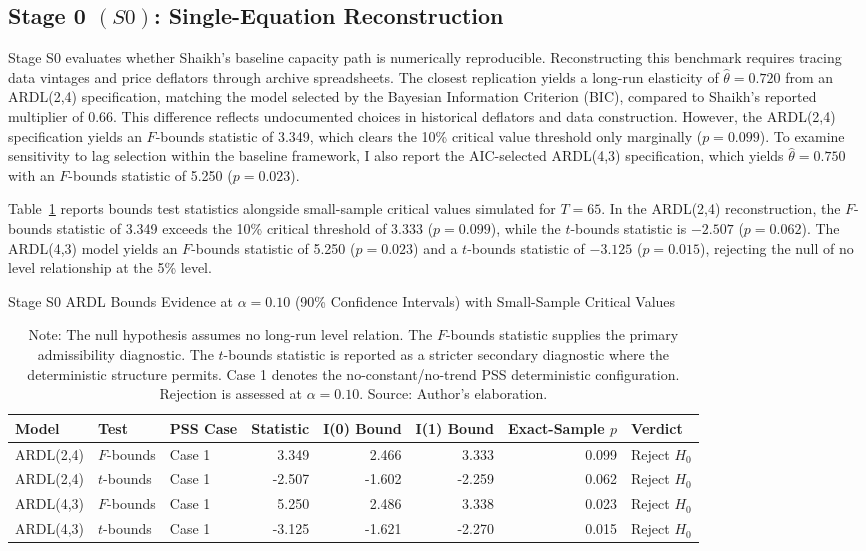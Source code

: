 \subsection{Stage 0 \texorpdfstring{$(S0)$}{}: Single-Equation Reconstruction}
\label{subsec:S0_reproducibility_new}

Stage S0 evaluates whether Shaikh's baseline capacity path is numerically reproducible. Reconstructing this benchmark requires tracing data vintages and price deflators through archive spreadsheets. The closest replication yields a long-run elasticity of $\hat{\theta}=0.720$ from an ARDL(2,4) specification, matching the model selected by the Bayesian Information Criterion (BIC), compared to Shaikh's reported multiplier of 0.66. This difference reflects undocumented choices in historical deflators and data construction. However, the ARDL(2,4) specification yields an $F$-bounds statistic of 3.349, which clears the 10\% critical value threshold only marginally ($p=0.099$). To examine sensitivity to lag selection within the baseline framework, I also report the AIC-selected ARDL(4,3) specification, which yields $\hat{\theta}=0.750$ with an $F$-bounds statistic of 5.250 ($p=0.023$).

Table~\ref{tab:s0_bounds_alpha10} reports bounds test statistics alongside small-sample critical values simulated for $T=65$. In the ARDL(2,4) reconstruction, the $F$-bounds statistic of 3.349 exceeds the 10\% critical threshold of 3.333 ($p=0.099$), while the $t$-bounds statistic is $-2.507$ ($p=0.062$). The ARDL(4,3) model yields an $F$-bounds statistic of 5.250 ($p=0.023$) and a $t$-bounds statistic of $-3.125$ ($p=0.015$), rejecting the null of no level relationship at the 5\% level.

\begin{table}[H]
\centering
\caption{Stage S0 ARDL Bounds Evidence at $\alpha=0.10$ (90\% Confidence Intervals) with Small-Sample Critical Values}
\label{tab:s0_bounds_alpha10}
\footnotesize
\begin{tabular}{lllrrrrl}
\toprule
Model & Test & PSS Case & Statistic & I(0) Bound & I(1) Bound & Exact-Sample $p$ & Verdict \\
\midrule
\midrule
ARDL(2,4) & $F$-bounds & Case 1 & 3.349 & 2.466 & 3.333 & 0.099 & Reject $H_0$ \\
ARDL(2,4) & $t$-bounds & Case 1 & -2.507 & -1.602 & -2.259 & 0.062 & Reject $H_0$ \\
ARDL(4,3) & $F$-bounds & Case 1 & 5.250 & 2.486 & 3.338 & 0.023 & Reject $H_0$ \\
ARDL(4,3) & $t$-bounds & Case 1 & -3.125 & -1.621 & -2.270 & 0.015 & Reject $H_0$ \\
\bottomrule
\end{tabular}
\caption*{\footnotesize Note: The null hypothesis assumes no long-run level relation. The $F$-bounds statistic supplies the primary admissibility diagnostic. The $t$-bounds statistic is reported as a stricter secondary diagnostic where the deterministic structure permits. Case 1 denotes the no-constant/no-trend PSS deterministic configuration. Rejection is assessed at $\alpha=0.10$. Source: Author's elaboration.}
\end{table}


